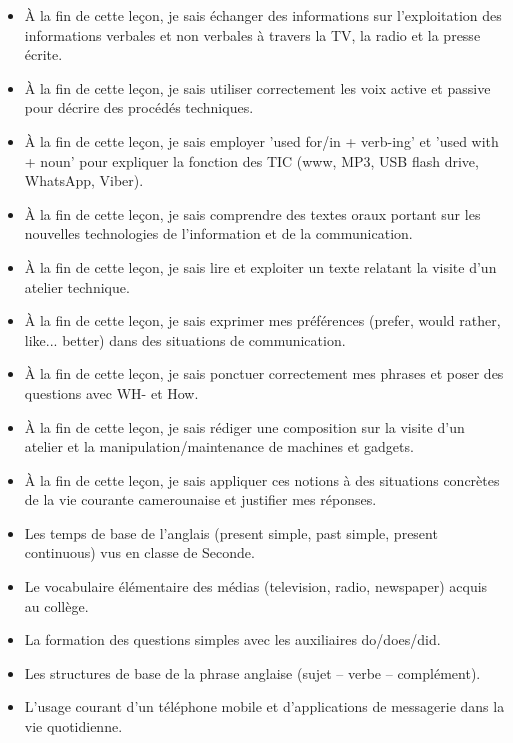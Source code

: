\documentclass[11pt]{article}
\begin{document}
\begin{objectifs}
\begin{itemize}
\item À la fin de cette leçon, je sais échanger des informations sur l'exploitation des informations verbales et non verbales à travers la TV, la radio et la presse écrite.
\item À la fin de cette leçon, je sais utiliser correctement les voix active et passive pour décrire des procédés techniques.
\item À la fin de cette leçon, je sais employer 'used for/in + verb-ing' et 'used with + noun' pour expliquer la fonction des TIC (www, MP3, USB flash drive, WhatsApp, Viber).
\item À la fin de cette leçon, je sais comprendre des textes oraux portant sur les nouvelles technologies de l'information et de la communication.
\item À la fin de cette leçon, je sais lire et exploiter un texte relatant la visite d'un atelier technique.
\item À la fin de cette leçon, je sais exprimer mes préférences (prefer, would rather, like... better) dans des situations de communication.
\item À la fin de cette leçon, je sais ponctuer correctement mes phrases et poser des questions avec WH- et How.
\item À la fin de cette leçon, je sais rédiger une composition sur la visite d'un atelier et la manipulation/maintenance de machines et gadgets.
\item À la fin de cette leçon, je sais appliquer ces notions à des situations concrètes de la vie courante camerounaise et justifier mes réponses.
\end{itemize}
\end{objectifs}

\begin{prerequis}
\begin{itemize}
\item Les temps de base de l'anglais (present simple, past simple, present continuous) vus en classe de Seconde.
\item Le vocabulaire élémentaire des médias (television, radio, newspaper) acquis au collège.
\item La formation des questions simples avec les auxiliaires do/does/did.
\item Les structures de base de la phrase anglaise (sujet – verbe – complément).
\item L'usage courant d'un téléphone mobile et d'applications de messagerie dans la vie quotidienne.
\end{itemize}
\end{prerequis}
\end{document}
